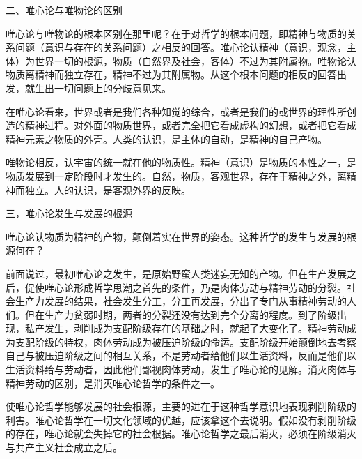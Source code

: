 二、唯心论与唯物论的区别

唯心论与唯物论的根本区别在那里呢？在于对哲学的根本问题，即精神与物质的关系问题（意识与存在的关系问题）之相反的回答。唯心论认精神（意识，观念，主体）为世界一切的根源，物质（自然界及社会，客体）不过为其附属物。唯物论认物质离精神而独立存在，精神不过为其附属物。从这个根本问题的相反的回答出发，就生出一切问题上的分歧意见来。

在唯心论看来，世界或者是我们各种知觉的综合，或者是我们的或世界的理性所创造的精神过程。对外面的物质世界，或者完全把它看成虚构的幻想，或者把它看成精神元素之物质的外壳。人类的认识，是主体的自动，是精神的自己产物。

唯物论相反，认宇宙的统一就在他的物质性。精神（意识）是物质的本性之一，是物质发展到一定阶段时才发生的。自然，物质，客观世界，存在于精神之外，离精神而独立。人的认识，是客观外界的反映。

三，唯心论发生与发展的根源

唯心论认物质为精神的产物，颠倒着实在世界的姿态。这种哲学的发生与发展的根源何在？

前面说过，最初唯心论之发生，是原始野蛮人类迷妄无知的产物。但在生产发展之后，促使唯心论形成哲学思潮之首先的条件，乃是肉体劳动与精神劳动的分裂。社会生产力发展的结果，社会发生分工，分工再发展，分出了专门从事精神劳动的人们。但在生产力贫弱时期，两者的分裂还没有达到完全分离的程度。到了阶级出现，私产发生，剥削成为支配阶级存在的基础之时，就起了大变化了。精神劳动成为支配阶级的特权，肉体劳动成为被压迫阶级的命运。支配阶级开始颠倒地去考察自己与被压迫阶级之间的相互关系，不是劳动者给他们以生活资料，反而是他们以生活资料给与劳动者，因此他们鄙视肉体劳动，发生了唯心论的见解。消灭肉体与精神劳动的区别，是消灭唯心论哲学的条件之一。

使唯心论哲学能够发展的社会根源，主要的进在于这种哲学意识地表现剥削阶级的利害。唯心论哲学在一切文化领域的优越，应该拿这个去说明。假如没有剥削阶级的存在，唯心论就会失掉它的社会根据。唯心论哲学之最后消灭，必须在阶级消灭与共产主义社会成立之后。

